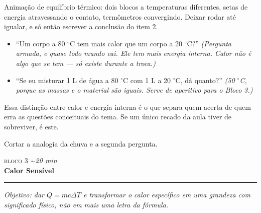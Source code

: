 \documentclass[11pt,a4paper]{article}
\newcommand{\bloco}[3]{%
  \needspace{7\baselineskip}
  \vspace{1.8em}
  {\scshape\color{vinho}bloco #1}\hfill
    {\small\itshape\color{grafite}\textasciitilde\,#3 min}\\[0.1em]
  {\Large\bfseries #2}\\[-0.55em]
  {\color{black!30}\rule{\linewidth}{0.5pt}}
  \par\nobreak\smallskip
}
\newcommand{\objetivo}[1]{{\itshape\color{grafite}Objetivo: #1}\par\smallskip}
\begin{document}
\begin{projetor}
Anima\c{c}\~ao de equil\'ibrio t\'ermico: dois blocos a temperaturas diferentes,
setas de energia atravessando o contato, term\^ometros convergindo. Deixar
rodar at\'e igualar, e s\'o ent\~ao escrever a conclus\~ao do item 2.
\end{projetor}

\begin{perguntas}
\begin{itemize}[nosep]
  \item ``Um corpo a 80 $^\circ$C tem mais calor que um corpo a
        20 $^\circ$C?'' \textit{(Pergunta armada, e quase todo mundo cai.
        Ele tem mais energia interna. Calor n\~ao \'e algo que se tem ---
        s\'o existe durante a troca.)}
  \item ``Se eu misturar 1 L de \'agua a 80 $^\circ$C com 1 L a
        20 $^\circ$C, d\'a quanto?'' \textit{(50 $^\circ$C, porque as massas
        e o material s\~ao iguais. Serve de aperitivo para o Bloco 3.)}
\end{itemize}
\end{perguntas}

\begin{obs}
Essa distin\c{c}\~ao entre calor e energia interna \'e o que separa quem acerta
de quem erra as quest\~oes conceituais do tema. Se um \'unico recado da aula
tiver de sobreviver, \'e este.
\end{obs}

\begin{corte}
Cortar a analogia da chuva e a segunda pergunta.
\end{corte}

\bloco{3}{Calor Sens\'ivel}{20}

\objetivo{dar $Q = mc\Delta T$ e transformar o calor espec\'ifico em uma
grandeza com significado f\'isico, n\~ao em mais uma letra da f\'ormula.}
\end{document}
